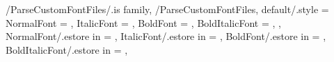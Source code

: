 \pgfkeys
{
  /ParseCustomFontFiles/.is family, /ParseCustomFontFiles,
  default/.style =
  {
    NormalFont = \empty,
    ItalicFont = \empty,
    BoldFont = \empty,
    BoldItalicFont = \empty,
  },
  NormalFont/.estore in = \TmpValueNormalFont,
  ItalicFont/.estore in = \TmpValueItalicFont,
  BoldFont/.estore in = \TmpValueBoldFont,
  BoldItalicFont/.estore in = \TmpValueBoldItalicFont,
} %

\newcommand{\SetCustomEngFontFiles}[1][\empty]
{%
  \SetFontUseType{\VarFontTypeCustom}
  \pgfkeys{/ParseCustomFontFiles, default, #1}%
  \ifthenelse{\equal{\TmpValueNormalFont}{\empty}}{}{%
    \renewcommand{\VarFontTypeCustomEngFileNameNormal}{%
        \TmpValueNormalFont}}%
  \ifthenelse{\equal{\TmpValueItalicFont}{\empty}}{}{%
    \renewcommand{\VarFontTypeCustomEngFileNameItalic}{%
        \TmpValueItalicFont}}%
  \ifthenelse{\equal{\TmpValueBoldFont}{\empty}}{}{%
    \renewcommand{\VarFontTypeCustomEngFileNameBold}{%
        \TmpValueBoldFont}}%
  \ifthenelse{\equal{\TmpValueBoldItalicFont}{\empty}}{}{%
    \renewcommand{\VarFontTypeCustomEngFileNameBoldItalic}{%
        \TmpValueBoldItalicFont}}%
} %

\newcommand{\SetCustomChiFontFiles}[1][\empty]
{%
  \SetFontUseType{\VarFontTypeCustom}
  \pgfkeys{/ParseCustomFontFiles, default, #1}%
  \ifthenelse{\equal{\TmpValueNormalFont}{\empty}}{}{%
    \renewcommand{\VarFontTypeCustomChiFileNameNormal}{%
        \TmpValueNormalFont}}%
  \ifthenelse{\equal{\TmpValueItalicFont}{\empty}}{}{%
    \renewcommand{\VarFontTypeCustomChiFileNameItalic}{%
        \TmpValueItalicFont}}%
  \ifthenelse{\equal{\TmpValueBoldFont}{\empty}}{}{%
    \renewcommand{\VarFontTypeCustomChiFileNameBold}{%
        \TmpValueBoldFont}}%
  \ifthenelse{\equal{\TmpValueBoldItalicFont}{\empty}}{}{%
    \renewcommand{\VarFontTypeCustomChiFileNameBoldItalic}{%
        \TmpValueBoldItalicFont}}%
} %

\newcommand{\VarFontTypeCustom}{10}


\def \VarFontDirPath {./ncku/fonts/} %
\def \GetFontDirPath {\VarFontDirPath}

\newcommand{\VarFontUseType}{\VarFontTypeTimesKaiu} %
\newcommand{\GetFontUseType}{\VarFontUseType}
\newcommand{\SetFontUseType}[1]
{%
  \renewcommand{\VarFontUseType}{#1}%
} %

